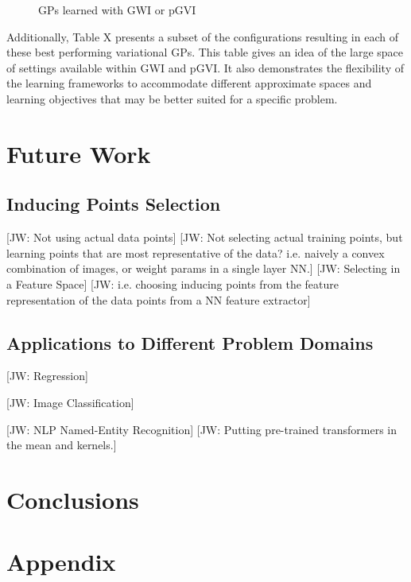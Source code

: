 \documentclass{article}
\newcommand{\jw}[1]{{\color{gray} [JW: #1]}}
\numberwithin{equation}{section}
\begin{document}
\begin{figure}[h!]
\begin{minipage}{.49\textwidth}
\end{minipage}%
\label{toy-curves-gps}
\caption{GPs learned with GWI or pGVI}
\end{figure}

Additionally, Table X presents a subset of the configurations resulting in each of these best performing variational GPs. 
This table gives an idea of the large space of settings available within GWI and pGVI. 
It also demonstrates the flexibility of the learning frameworks to accommodate different approximate spaces and learning objectives that may be better suited for a specific problem. 

\newpage
\section{Future Work}

\subsection{Inducing Points Selection}
\jw{Not using actual data points}
\jw{Not selecting actual training points, but learning points that are most representative of the data? i.e. naively a convex combination of images, or weight params in a single layer NN.}
\jw{Selecting in a Feature Space}
\jw{i.e. choosing inducing points from the feature representation of the data points from a NN feature extractor}


\subsection{Applications to Different Problem Domains}

\jw{Regression}

\jw{Image Classification}


\jw{NLP Named-Entity Recognition}
\jw{Putting pre-trained transformers in the mean and kernels.}



\newpage
\section{Conclusions}


\newpage



\newpage
\appendix
\section{Appendix}
\end{document}
